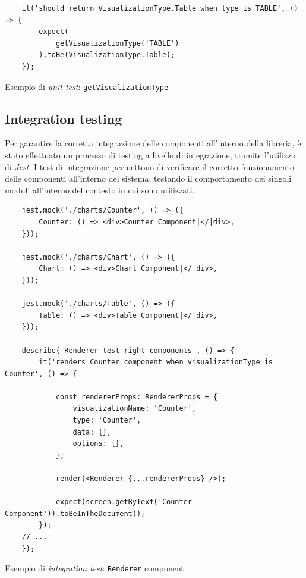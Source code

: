 \begin{listing}[H]
    \begin{verbatim}
    it('should return VisualizationType.Table when type is TABLE', () => {
        expect(
            getVisualizationType('TABLE')
        ).toBe(VisualizationType.Table);
    });
    \end{verbatim}
    \caption{Esempio di \textit{unit test}: \texttt{getVisualizationType}}
    \label{listing:test_getVisualizationType}
\end{listing}

\subsection{Integration testing}
Per garantire la corretta integrazione delle componenti all'interno della libreria, è stato effettuato un processo di testing a livello di integrazione,
tramite l'utilizzo di \textit{Jest}. \newline
I test di integrazione permettono di verificare il corretto funzionamento delle componenti all'interno del sistema, testando il comportamento
dei singoli moduli all'interno del contesto in cui sono utilizzati.

\begin{listing}[H]
    \begin{verbatim}
    jest.mock('./charts/Counter', () => ({
        Counter: () => <div>Counter Component|</|div>,
    }));

    jest.mock('./charts/Chart', () => ({
        Chart: () => <div>Chart Component|</|div>,
    }));

    jest.mock('./charts/Table', () => ({
        Table: () => <div>Table Component|</|div>,
    }));
    
    describe('Renderer test right components', () => {
        it('renders Counter component when visualizationType is Counter', () => {

            const rendererProps: RendererProps = {
                visualizationName: 'Counter',
                type: 'Counter',
                data: {},
                options: {},
            };

            render(<Renderer {...rendererProps} />);

            expect(screen.getByText('Counter Component')).toBeInTheDocument();
        });
    // ...
    });
    \end{verbatim}
    \caption{Esempio di \textit{integration test}: \texttt{Renderer} component}
    \label{listing:test_Renderer_integration}
\end{listing}

